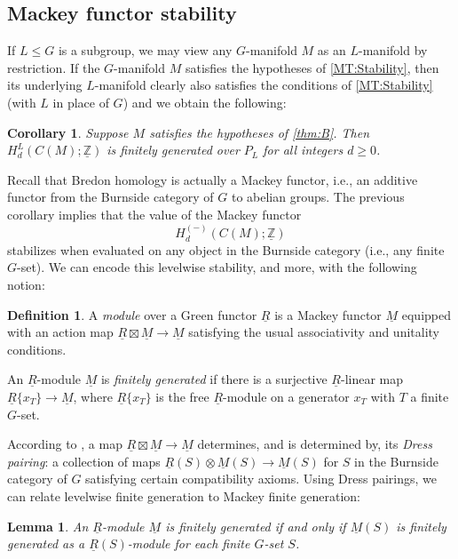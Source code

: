\documentclass[11pt]{amsart}
\newtheorem{lemma}[equation]{Lemma}
\newtheorem{corollary}[equation]{Corollary}
\theoremstyle{definition}
\newtheorem{definition}[equation]{Definition}
\numberwithin{equation}{subsection} %
\def\uM{\underline{M}}
\def\uR{\underline{R}}
\def\uM{\underline{M}}
\def\mfz{\underline{\mathbb{Z}}}
\begin{document}
\subsection{Mackey functor stability}

If $L \leq G$ is a subgroup, we may view any $G$-manifold $M$ as an $L$-manifold by restriction. If the $G$-manifold $M$ satisfies the hypotheses of \cref{MT:Stability}, then its underlying $L$-manifold clearly also satisfies the conditions of \cref{MT:Stability} (with $L$ in place of $G$) and we obtain the following:

\begin{corollary}
Suppose $M$ satisfies the hypotheses of \cref{thm:B}.
Then $H_d^L(C(M);\mfz)$ is finitely generated over $P_L$ for all integers $d \geq 0$.  
\end{corollary}

Recall that Bredon homology is actually a Mackey functor, i.e., an additive functor from the Burnside category of $G$ to abelian groups. The previous corollary implies that the value of the Mackey functor
$$H_d^{(-)}(C(M); \mfz)$$
stabilizes when evaluated on any object in the Burnside category (i.e., any finite $G$-set). We can encode this levelwise stability, and more, with the following notion:

\begin{definition}
A \emph{module} over a Green functor $\uR$ is a Mackey functor $\uM$ equipped with an action map $\uR \boxtimes \uM \to \uM$ satisfying the usual associativity and unitality conditions. 

An $\uR$-module $\uM$ is \emph{finitely generated} if there is a surjective $\uR$-linear map $\uR\{x_T\} \to \uM$, where $\uR\{x_T\}$ is the free $\uR$-module on a generator $x_T$ with $T$ a finite $G$-set. 
\end{definition}

According to \cite[Lem. 2.17]{Shu10}, a map $\uR \boxtimes \uM \to \uM$ determines, and is determined by, its  \emph{Dress pairing}: a collection of maps $\uR(S) \otimes \uM(S) \to \uM(S)$ for $S$ in the Burnside category of $G$ satisfying certain compatibility axioms.  Using Dress pairings, we can relate levelwise finite generation to Mackey finite generation:

\begin{lemma}\label{Lem:FGLevelwise}
An $\uR$-module $\uM$ is finitely generated if and only if $\uM(S)$ is finitely generated as a $\uR(S)$-module for each finite $G$-set $S$.
\end{lemma}
\end{document}
